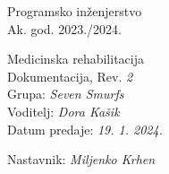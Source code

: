 \documentclass[12pt]{report}
\begin{document}
 
		
		
		
		\begin{titlepage}
			\begin{center}
				\LARGE Programsko inženjerstvo\\
				\large Ak. god. 2023./2024.\\
				
				
				\huge Medicinska rehabilitacija\\
				\Large Dokumentacija, Rev. \textit{2}\\
				
				\normalsize
				Grupa: \textit{Seven Smurfs}\\
				Voditelj: \textit{Dora Kašik}\\
				
				
				Datum predaje: \textit{19. 1. 2024.}\\
				
				
				Nastavnik: \textit{Miljenko Krhen}\\
				
			\end{center}
			
			
		\end{titlepage}
		
		
		\tableofcontents
		
		
		
		
		
		
		
		
		
		
		
		\begingroup
		\renewcommand*\listfigurename{Indeks slika i dijagrama}
		\listoffigures
		\endgroup
		
		
		
		\eject 
		
		
		
		
	
\end{document}
